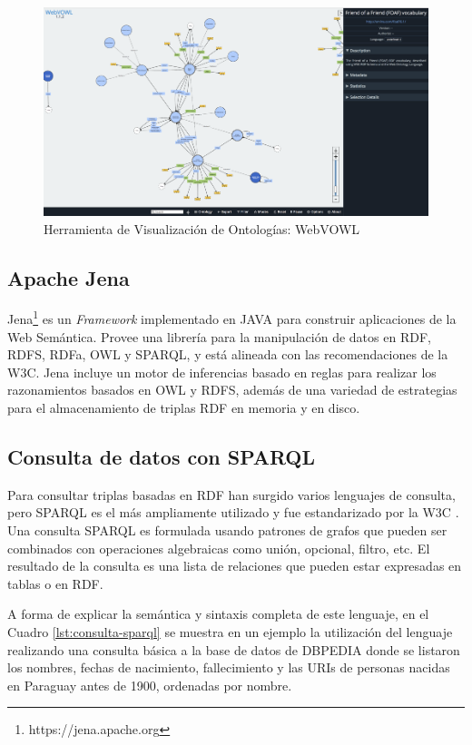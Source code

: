 \begin{figure}[h!]
    \centering
    \includegraphics[width=150mm]{figuras/webvowl}
    \caption{Herramienta de Visualización de Ontologías: WebVOWL}
    \label{img:webvowl}
    \end{figure}
    

\subsection{Apache Jena}
\label{subsection:jena}
Jena\footnote{https://jena.apache.org} es un \textit{Framework} implementado en JAVA para construir aplicaciones de la Web Semántica. Provee una librería para la manipulación de datos en RDF, RDFS, RDFa, OWL y SPARQL, y está alineada con las recomendaciones de la W3C\cite{Semantic20:online}. Jena incluye un motor de inferencias basado en reglas para realizar los razonamientos basados en OWL y RDFS, además de una variedad de estrategias para el almacenamiento de triplas RDF en memoria y en disco.

\subsection{Consulta de datos con SPARQL}
\label{subsection:fuseki}
Para consultar triplas basadas en RDF han surgido varios lenguajes de consulta, pero SPARQL es el más ampliamente utilizado y fue estandarizado por la W3C \cite{SPARQLDpoc:online}. Una consulta SPARQL es formulada usando patrones de grafos que pueden ser combinados con operaciones algebraicas como unión, opcional, filtro, etc. El resultado de la consulta es una lista de relaciones que pueden estar expresadas en tablas o en RDF.

A forma de explicar la semántica y sintaxis completa de este lenguaje, en el Cuadro \ref{lst:consulta-sparql} se muestra en un ejemplo la utilización del lenguaje realizando una consulta básica a la base de datos de DBPEDIA \cite{DBpedia:online} donde se listaron los nombres, fechas de nacimiento, fallecimiento y las URIs de personas nacidas en Paraguay antes de 1900, ordenadas por nombre.\hfill \break


